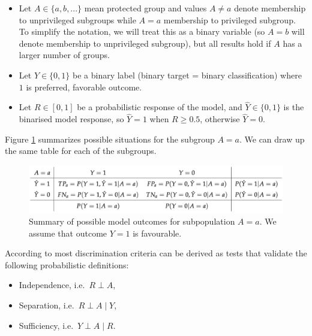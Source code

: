 \begin{itemize}
\tightlist
\item
  Let \(A \in \{a,b, ...\}\) mean protected group and values
  \(A \neq a\) denote membership to unprivileged subgroups while
  \(A = a\) membership to privileged subgroup. To simplify the notation,
  we will treat this as a binary variable (so \(A = b\) will denote
  membership to unprivileged subgroup), but all results hold if \(A\)
  has a larger number of groups.\\
\item
  Let \(Y \in \{0,1\}\) be a binary label (binary target = binary
  classification) where \(1\) is preferred, favorable outcome.
\item
  Let \(R \in [0,1]\) be a probabilistic response of the model, and
  \(\hat{Y} \in \{0,1\}\) is the binarised model response, so
  \(\hat{Y} = 1\) when \(R \geq 0.5\), otherwise \(\hat{Y} = 0\).
\end{itemize}

Figure \ref{fig:fairnessTable1} summarizes possible situations for the
subgroup \(A=a\). We can draw up the same table for each of the
subgroups.

\begin{Schunk}
\begin{figure}

{\centering \includegraphics[width=1\linewidth]{table1} 

}

\caption[Summary of possible model outcomes for subpopulation $A = a$]{Summary of possible model outcomes for subpopulation $A = a$. We assume that outcome $Y = 1$ is favourable.}\label{fig:fairnessTable1}
\end{figure}
\end{Schunk}

According to \citet{barocas-hardt-narayanan} most discrimination
criteria can be derived as tests that validate the following
probabilistic definitions:

\begin{itemize}
\tightlist
\item
  Independence, i.e.~\(R \perp A\),
\item
  Separation, i.e.~\(R \perp A \mid Y\),
\item
  Sufficiency, i.e.~\(Y \perp A \mid R\).
\end{itemize}

